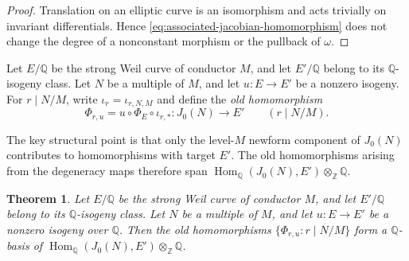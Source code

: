 \documentclass[12pt, letterpaper]{amsart}
\newtheorem{theorem}{Theorem}[section]
\theoremstyle{definition}
\theoremstyle{remark}
\newcommand{\Q}{\mathbb Q}
\newcommand{\Z}{\mathbb Z}
\newcommand{\Hom}{\operatorname{Hom}}
\numberwithin{equation}{section}
\begin{document}
\begin{proof}
Translation on an elliptic curve is an isomorphism and acts trivially on
invariant differentials. Hence \eqref{eq:associated-jacobian-homomorphism} does
not change the degree of a nonconstant morphism or the pullback of \(\omega\).
\end{proof}

Let \(E/\Q\) be the strong Weil curve of conductor \(M\), and let \(E'/\Q\)
belong to its \(\Q\)-isogeny class. Let \(N\) be a multiple of \(M\), and let
\(u:E\to E'\) be a nonzero isogeny. For \(r\mid N/M\), write
\(\iota_r=\iota_{r,N,M}\) and define the \emph{old homomorphism}
\begin{equation}\label{eq:old-homomorphism-definition}
        \Phi_{r,u}=u\circ\Phi_E\circ\iota_{r,*}:J_0(N)\longrightarrow E'
        \qquad(r\mid N/M).
\end{equation}

The key structural point is that only the level-\(M\) newform component of
\(J_0(N)\) contributes to homomorphisms with target \(E'\). The old
homomorphisms arising from the degeneracy maps therefore span
\(\Hom_\Q(J_0(N),E')\otimes_\Z\Q\).

\begin{theorem}\label{thm:rational-old-basis}
Let \(E/\Q\) be the strong Weil curve of conductor \(M\), and let \(E'/\Q\)
belong to its \(\Q\)-isogeny class. Let \(N\) be a multiple of \(M\), and let
\(u:E\to E'\) be a nonzero isogeny over \(\Q\). Then
the old homomorphisms \(\{\Phi_{r,u}:r\mid N/M\}\) form a \(\Q\)-basis of
\(\Hom_\Q(J_0(N),E')\otimes_\Z\Q\).
\end{theorem}
\end{document}
